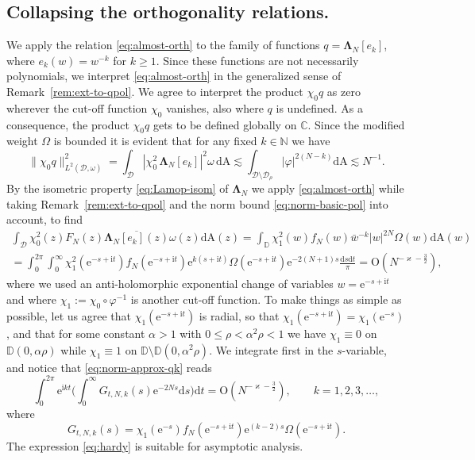 \documentclass{amsart}
\newcommand{\be}{\begin{equation}}
\newcommand{\ee}{\end{equation}}
\newcommand{\C}{\mathbb{C}}
\newcommand{\D}{\mathbb{D}}
\newcommand{\N}{\mathbb{N}}
\newcommand{\calD}{\mathcal{D}}
\newcommand{\diffA}{\mathrm{dA}}
\newcommand{\diff}{\mathrm{d}}
\newcommand{\Lamop}{\mathbf{\Lambda}}
\theoremstyle{definition}
\theoremstyle{remark}
\newcommand{\e}{\mathrm{e}}
\newcommand{\Ordo}{\mathrm{O}}
\newcommand{\imag}{\mathrm{i}}
\numberwithin{equation}{subsection}
\begin{document}
\subsection{Collapsing the orthogonality relations.}
We apply the relation \eqref{eq:almost-orth} to the family of functions
$q=\Lamop_N[e_k]$, where $e_k(w)=w^{-k}$ for
$k\ge 1$. Since these functions are not necessarily polynomials,
we interpret \eqref{eq:almost-orth} in the generalized sense
of Remark~\ref{rem:ext-to-qpol}.
We agree to interpret the product $\chi_0 q$ as zero wherever the cut-off function 
$\chi_0$ vanishes, also where $q$ is undefined. As a consequence, the product
$\chi_0 q$ gets to be defined globally on $\C$.
Since the modified weight $\Omega$ is bounded it is 
evident that for any fixed $k\in\N$ we have
\be\label{eq:norm-basic-pol}
\lVert \chi_0 q\rVert_{L^2(\calD,\omega)}^2=\int_{\calD}|\chi_0^2\,\Lamop_N[e_k]|^2\omega\,\diffA
\lesssim \int_{\calD\setminus\calD_\rho}|\varphi|^{2(N-k)}
\diffA\lesssim N^{-1}.
\ee
By the isometric property \eqref{eq:Lamop-isom} of $\Lamop_N$ we apply 
\eqref{eq:almost-orth}
while taking Remark~\ref{rem:ext-to-qpol}
and the norm bound \eqref{eq:norm-basic-pol} into account, to find
\begin{multline}\label{eq:norm-approx-qk}
\int_{\calD}\chi_0^2(z)F_N(z)\overline{\Lamop_N[e_{k}](z)}\omega(z)\diffA(z)
= \int_{\D}\chi_1^2(w)f_N(w)\bar{w}^{-k}|w|^{2N}\Omega(w)\diffA(w)
\\
=\int_{0}^{2\pi}\int_0^{\infty}\chi_1^2(\e^{-s+\imag t})
f_N(\e^{-s+\imag t})
\e^{k(s+\imag t)}\Omega(\e^{-s+\imag t})
\e^{-2(N+1)s}\frac{\diff s\diff t}{\pi}=\Ordo(N^{-\varkappa-\frac32}),
\end{multline}
where we used an anti-holomorphic exponential change of 
variables $w=\e^{-s+\imag t}$ and where $\chi_1:=\chi_0\circ\varphi^{-1}$
is another cut-off function.
To make things as simple as possible, 
let us agree that $\chi_1(\e^{-s+\imag t})$ is radial, 
so that $\chi_1(\e^{-s+\imag t})=\chi_1(\e^{-s})$,
and that for some constant $\alpha>1$ with
$0\le \rho<\alpha^2 \rho<1$
we have $\chi_1\equiv 0$ on $\D(0,\alpha\rho)$ while $\chi_1\equiv 1$ on 
$\D\setminus\D(0,\alpha^2 \rho)$.
We integrate first in the $s$-variable, 
and notice that \eqref{eq:norm-approx-qk} reads
\be\label{eq:hardy}
\int_0^{2\pi}\e^{\imag k t}\Big(\int_0^{\infty}G_{t,N,k}(s)
\e^{-2Ns}\diff s\Big)\diff t=\Ordo(N^{-\varkappa-\frac32}),\qquad k=1,2,3,\ldots,
\ee
where
\be\label{eq:G-form}
G_{t,N,k}(s)=\chi_1(\e^{-s})f_N(\e^{-s+\imag t})
\e^{(k-2)s}\Omega(\e^{-s+\imag t}).
\ee
The expression \eqref{eq:hardy} is suitable for asymptotic analysis.
\end{document}
